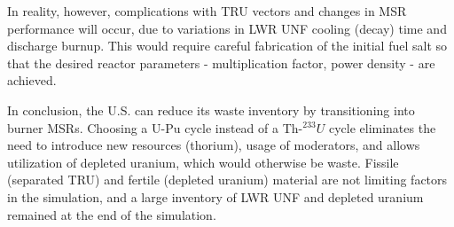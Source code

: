 In reality, however, complications with \gls{TRU} vectors and changes in \gls{MSR}
performance will occur, due to variations in \gls{LWR} \gls{UNF}
cooling (decay) time and discharge burnup. This would require careful fabrication of the initial fuel salt
so that the desired reactor parameters - multiplication factor, power density - are achieved.

In conclusion, the U.S. can reduce its waste inventory by transitioning into
burner \glspl{MSR}. Choosing a U-Pu cycle instead of a Th-$^{233}U$ cycle
eliminates the need to introduce new resources (thorium), usage of moderators,
and allows utilization of depleted uranium, which would otherwise be waste.
Fissile (separated \gls{TRU}) and fertile (depleted uranium) material are
not limiting factors in the simulation, and a large inventory of \gls{LWR} \gls{UNF}
and depleted uranium remained at the end of the simulation.
